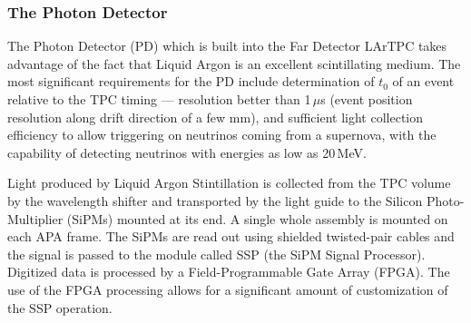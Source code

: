 \subsubsection{The Photon Detector}
\label{sec:pd}
The Photon Detector (PD) which is built into the Far Detector LArTPC takes advantage of the fact that Liquid Argon
is an excellent scintillating medium.
The most significant requirements for the PD include determination of $t_0$ of an event relative to the TPC timing ---
resolution better than 1\,$\mu$s (event position resolution along drift direction of a few mm), and sufficient light
collection efficiency to allow triggering on neutrinos coming from a supernova, with the capability of detecting neutrinos with energies as
low as 20\,MeV.

Light produced by Liquid Argon Stintillation is collected from the TPC volume by the wavelength shifter and transported
by the light guide to the Silicon Photo-Multiplier (SiPMs) mounted at its end. A single whole assembly is mounted on each  APA frame.
The SiPMs are read out using shielded twisted-pair cables and the signal is passed to the module called SSP (the SiPM Signal
Processor). Digitized data is processed by a  Field-Programmable Gate Array (FPGA). The use
of the FPGA processing allows for a significant amount of customization of the SSP operation.



